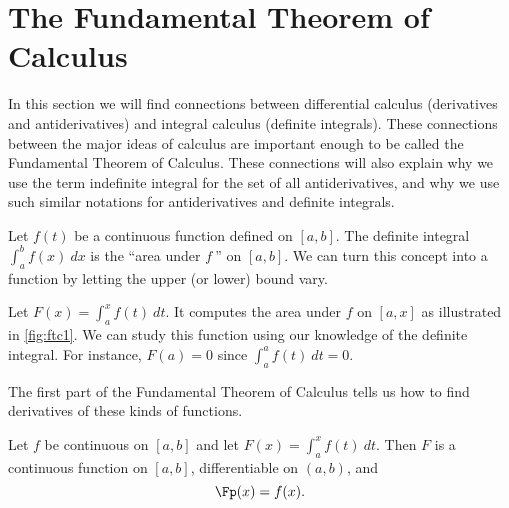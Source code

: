 \section{The Fundamental Theorem of Calculus}\label{sec:FTC}

In this section we will find connections between differential calculus (derivatives and antiderivatives) and integral calculus (definite integrals). These connections between the major ideas of calculus are important enough to be called the Fundamental Theorem of Calculus. These connections will also explain why we use the term indefinite integral for the set of all antiderivatives, and why we use such similar notations for antiderivatives and definite integrals.

Let $f(t)$ be a continuous function defined on $[a,b]$. The definite integral $\int_a^b f(x)\ dx$ is the ``area under $f\ $'' on $[a,b]$. We can turn this concept into a function by letting the upper (or lower) bound vary.

Let $F(x) = \int_a^x f(t)\ dt$. It computes the area under $f$ on $[a,x]$ as illustrated in \autoref{fig:ftc1}. We can study this function using our knowledge of the definite integral. For instance, $F(a)=0$ since $\int_a^af(t)\ dt=0$. %


The first part of the Fundamental Theorem of Calculus tells us how to find derivatives of these kinds of functions.

\begin{theorem}\label{thm:FTC1}
Let $f$ be continuous on $[a,b]$ and let $F(x) = \int_a^x f(t)\ dt$. Then $F$ is a continuous function on $[a,b]$, differentiable on $(a,b)$, and
\[\Fp(x)=f(x).\]
\end{theorem}


